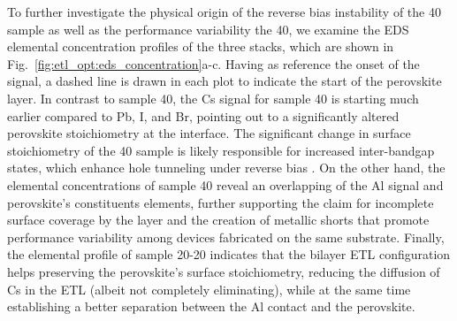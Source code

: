 \begin{figure}[t]
\begin{subfigure}[t]{0.4\textwidth}
        \caption{}
        \label{}
    \end{subfigure}
    \caption{}
    \label{fig:etl_opt:10nmC60_30nmTiO2}
\end{figure}


To further investigate the physical origin of the reverse bias instability of the 40 sample as well as the performance variability the 40, we examine the EDS elemental concentration profiles of the three stacks, which are shown in Fig.~\ref{fig:etl_opt:eds_concentration}a-c. Having as reference the onset of the  signal, a dashed line is drawn in each plot to indicate the start of the perovskite layer. In contrast to sample 40, the Cs signal for sample 40 is starting much earlier compared to Pb, I, and Br, pointing out to a significantly altered perovskite stoichiometry at the interface. The significant change in surface stoichiometry of the 40 sample is likely responsible for increased inter-bandgap states, which enhance hole tunneling under reverse bias \cite{Huang2018IntrinsicCsPbI3, Kang2017HighCsPbBr3, Chu2020SoftDefects}. On the other hand, the elemental concentrations of sample 40 reveal an overlapping of the Al signal and perovskite's constituents elements, further supporting the claim for incomplete surface coverage by the  layer and the creation of metallic shorts that promote performance variability among devices fabricated on the same substrate. Finally, the elemental profile of sample 20-20 indicates that the bilayer ETL configuration helps preserving the perovskite's surface stoichiometry, reducing the diffusion of Cs in the ETL (albeit not completely eliminating), while at the same time establishing a better separation between the Al contact and the perovskite. 



